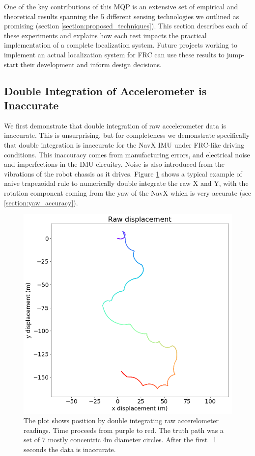 \documentclass{article}
\begin{document}
  One of the key contributions of this MQP is an extensive set of empirical and theoretical results spanning the 5 different sensing technologies we outlined as promising (section \ref{section:proposed_techniques}). This section describes each of these experiments and explains how each test impacts the practical implementation of a complete localization system. Future projects working to implement an actual localization system for FRC can use these results to jump-start their development and inform design decisions.

  \subsection{Double Integration of Accelerometer is Inaccurate} \label{section:double_integration_is_inaccurate}

    We first demonstrate that double integration of raw accelerometer data is inaccurate. This is unsurprising, but for completeness we demonstrate specifically that double integration is inaccurate for the NavX IMU under FRC-like driving conditions. This inaccuracy comes from manufacturing errors, and electrical noise and imperfections in the IMU circuitry. Noise is also introduced from the vibrations of the robot chassis as it drives. Figure \ref{fig:double_integration} shows a typical example of naive trapezoidal rule to numerically double integrate the raw X and Y, with the rotation component coming from the yaw of the NavX which is very accurate (see \ref{section:yaw_accuracy}).

    \begin{figure}[H]
      \centering
      \includegraphics[width=0.8\linewidth]{./images/raw-displacement.png}
      \caption{The plot shows position by double integrating raw accerelometer readings. Time proceeds from purple to red. The truth path was a set of 7 mostly concentric 4m diameter circles. After the first ~1 seconds the data is inaccurate.}
      \label{fig:double_integration}
    \end{figure}
\end{document}

